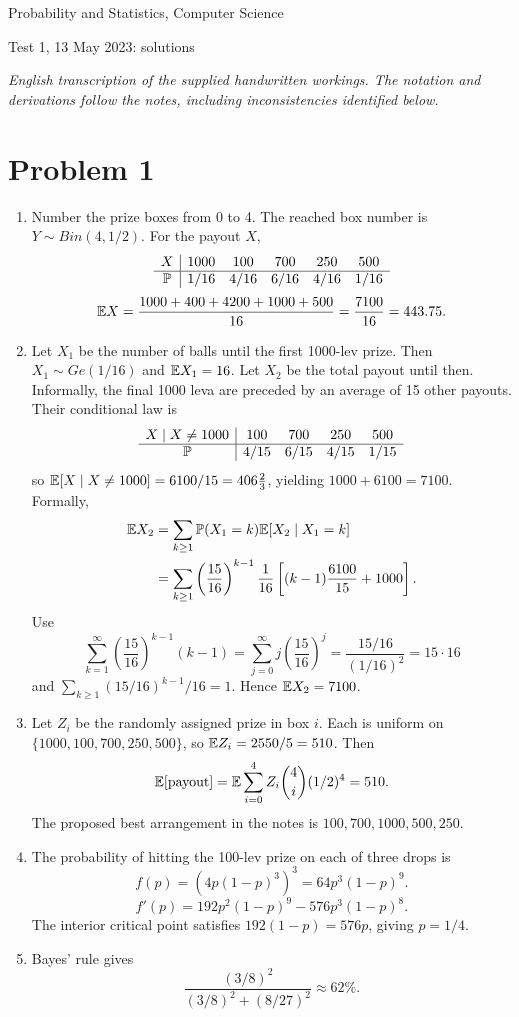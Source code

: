 \documentclass[a4paper]{article}
\begin{document}
\begin{center}\Large Probability and Statistics, Computer Science\par\large Test 1, 13 May 2023: solutions\end{center}
\noindent\textit{English transcription of the supplied handwritten workings. The notation and derivations follow the notes, including inconsistencies identified below.}
\section*{Problem 1}
\begin{enumerate}
\item Number the prize boxes from 0 to 4. The reached box number is $Y\sim Bin(4,1/2)$. For the payout $X$,
\[\begin{array}{c|ccccc}X&1000&100&700&250&500\\\hline\P&1/16&4/16&6/16&4/16&1/16\end{array}\]
\[\E X=\frac{1000+400+4200+1000+500}{16}=\frac{7100}{16}=443.75.\]
\item Let $X_1$ be the number of balls until the first 1000-lev prize. Then $X_1\sim Ge(1/16)$ and $\E X_1=16$. Let $X_2$ be the total payout until then. Informally, the final 1000 leva are preceded by an average of 15 other payouts. Their conditional law is
\[\begin{array}{c|cccc}X\mid X\ne1000&100&700&250&500\\\hline\P&4/15&6/15&4/15&1/15\end{array}\]
so $\E[X\mid X\ne1000]=6100/15=406\frac23$, yielding $1000+6100=7100$.
Formally,
\begin{align*}
\E X_2&=\sum_{k\ge1}\P(X_1=k)\E[X_2\mid X_1=k]\\
&=\sum_{k\ge1}\left(\frac{15}{16}\right)^{k-1}\frac1{16}\left[(k-1)\frac{6100}{15}+1000\right].
\end{align*}
Use
\[\sum_{k=1}^\infty\left(\frac{15}{16}\right)^{k-1}(k-1)=\sum_{j=0}^\infty j\left(\frac{15}{16}\right)^j=\frac{15/16}{(1/16)^2}=15\cdot16\]
and $\sum_{k\ge1}(15/16)^{k-1}/16=1$. Hence $\E X_2=7100$.
\item Let $Z_i$ be the randomly assigned prize in box $i$. Each is uniform on $\{1000,100,700,250,500\}$, so $\E Z_i=2550/5=510$. Then
\[\E[\text{payout}]=\E\sum_{i=0}^4Z_i\binom4i(1/2)^4=510.\]
The proposed best arrangement in the notes is $100,700,1000,500,250$.
\item The probability of hitting the 100-lev prize on each of three drops is
\[f(p)=(4p(1-p)^3)^3=64p^3(1-p)^9.\]
\[f'(p)=192p^2(1-p)^9-576p^3(1-p)^8.\]
The interior critical point satisfies $192(1-p)=576p$, giving $p=1/4$.
\item Bayes' rule gives
\[\frac{(3/8)^2}{(3/8)^2+(8/27)^2}\approx62\%.\]
\end{enumerate}
\end{document}
